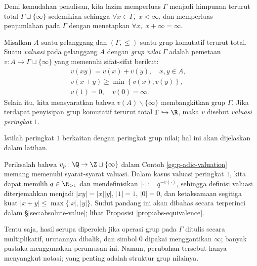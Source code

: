 Demi kemudahan penulisan, kita lazim memperluas $\Gamma$ menjadi himpunan terurut total $\Gamma \sqcup \{\infty\}$ sedemikian sehingga $\forall x \in \Gamma,\; x < \infty$, dan memperluas penjumlahan pada $\Gamma$ dengan menetapkan $\forall x,\; x + \infty = \infty$.

\begin{definition}[W.\ Krull]\label{def:Krull-valuation}
	Misalkan $A$ suatu gelanggang dan $(\Gamma, \leq)$ suatu grup komutatif terurut total. Suatu \emph{valuasi} pada gelanggang $A$ dengan \emph{grup nilai} $\Gamma$ adalah pemetaan $v: A \to \Gamma \sqcup \{\infty\}$ yang memenuhi sifat-sifat berikut:
	\begin{gather}
		v(xy) = v(x) + v(y), \quad x,y \in A, \label{eqn:valuation-homo} \\
		v(x+y) \geq \min\left\{ v(x), v(y) \right\}, \label{eqn:valuation-ineq} \\
		v(1) = 0, \quad v(0)=\infty \label{eqn:valuation-calibration}.
	\end{gather}
	Selain itu, kita mensyaratkan bahwa $v(A) \smallsetminus \{\infty\}$ membangkitkan grup $\Gamma$. Jika terdapat penyisipan grup komutatif terurut total $\Gamma \hookrightarrow \R$, maka $v$ disebut \emph{valuasi peringkat $1$}.
\end{definition}
Istilah peringkat $1$ berkaitan dengan peringkat grup nilai; hal ini akan dijelaskan dalam latihan.

Periksalah bahwa $v_p: \Q \to \Z \sqcup \{\infty\}$ dalam Contoh \ref{eg:p-adic-valuation} memang memenuhi syarat-syarat valuasi. Dalam kasus valuasi peringkat $1$, kita dapat memilih $q \in \R_{>1}$ dan mendefinisikan $|\cdot| := q^{-v(\cdot)}$, sehingga definisi valuasi diterjemahkan menjadi $|xy|=|x| |y|$, $|1|=1$, $|0|=0$, dan ketaksamaan segitiga kuat $|x+y| \leq \max\{|x|, |y|\}$. Sudut pandang ini akan dibahas secara terperinci dalam \S\ref{sec:absolute-value}; lihat Proposisi \ref{prop:abs-equivalence}.

Tentu saja, hasil serupa diperoleh jika operasi grup pada $\Gamma$ ditulis secara multiplikatif, urutannya dibalik, dan simbol $0$ dipakai menggantikan $\infty$; banyak pustaka menggunakan perumusan ini. Namun, perubahan tersebut hanya menyangkut notasi; yang penting adalah struktur grup nilainya.

